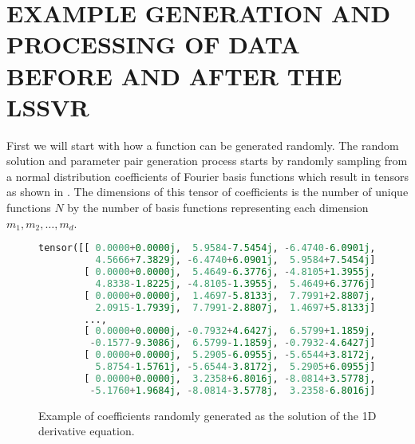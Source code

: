 \appendix

\chapter{EXAMPLE GENERATION AND PROCESSING OF DATA BEFORE AND AFTER THE LSSVR}\label{ch:example_prepostprocessing_basis}
First we will start with how a function can be generated randomly. The random solution and parameter pair generation process starts by randomly sampling from a normal distribution coefficients of Fourier basis functions which result in tensors as shown in . The dimensions of this tensor of coefficients is the number of unique functions \(N\) by the number of basis functions representing each dimension \(m_1, m_2, \ldots, m_d\).
\begin{figure}[H]
  \centering
  \begin{lstlisting}[language=Python]
tensor([[ 0.0000+0.0000j,  5.9584-7.5454j, -6.4740-6.0901j,  ...,
          4.5666+7.3829j, -6.4740+6.0901j,  5.9584+7.5454j],
        [ 0.0000+0.0000j,  5.4649-6.3776j, -4.8105+1.3955j,  ...,
          4.8338-1.8225j, -4.8105-1.3955j,  5.4649+6.3776j],
        [ 0.0000+0.0000j,  1.4697-5.8133j,  7.7991+2.8807j,  ...,
          2.0915-1.7939j,  7.7991-2.8807j,  1.4697+5.8133j],
        ...,
        [ 0.0000+0.0000j, -0.7932+4.6427j,  6.5799+1.1859j,  ...,
         -0.1577-9.3086j,  6.5799-1.1859j, -0.7932-4.6427j],
        [ 0.0000+0.0000j,  5.2905-6.0955j, -5.6544+3.8172j,  ...,
          5.8754-1.5761j, -5.6544-3.8172j,  5.2905+6.0955j],
        [ 0.0000+0.0000j,  3.2358+6.8016j, -8.0814+3.5778j,  ...,
         -5.1760+1.9684j, -8.0814-3.5778j,  3.2358-6.8016j]])
\end{lstlisting}
  \caption{Example of coefficients randomly generated as the solution of the 1D derivative equation.}\label{fig:example_generated_coefficients}
\end{figure}

